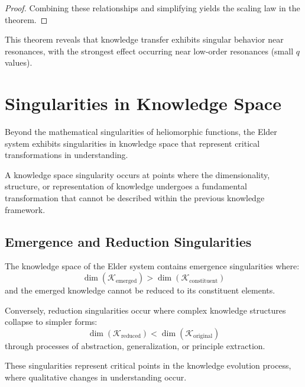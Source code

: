 \begin{definition}
\begin{enumerate}
\begin{proof}
Combining these relationships and simplifying yields the scaling law in the theorem.
\end{proof}

This theorem reveals that knowledge transfer exhibits singular behavior near resonances, with the strongest effect occurring near low-order resonances (small $q$ values).

\section{Singularities in Knowledge Space}

Beyond the mathematical singularities of heliomorphic functions, the Elder system exhibits singularities in knowledge space that represent critical transformations in understanding.

\begin{definition}
A knowledge space singularity occurs at points where the dimensionality, structure, or representation of knowledge undergoes a fundamental transformation that cannot be described within the previous knowledge framework.
\end{definition}

\subsection{Emergence and Reduction Singularities}

\begin{theorem}
The knowledge space of the Elder system contains emergence singularities where:
\begin{equation}
\dim(\mathcal{K}_{\text{emerged}}) > \dim(\mathcal{K}_{\text{constituent}})
\end{equation}
and the emerged knowledge cannot be reduced to its constituent elements.
\end{theorem}

\begin{theorem}
Conversely, reduction singularities occur where complex knowledge structures collapse to simpler forms:
\begin{equation}
\dim(\mathcal{K}_{\text{reduced}}) < \dim(\mathcal{K}_{\text{original}})
\end{equation}
through processes of abstraction, generalization, or principle extraction.
\end{theorem}

These singularities represent critical points in the knowledge evolution process, where qualitative changes in understanding occur.


\end{enumerate}
\end{definition}
